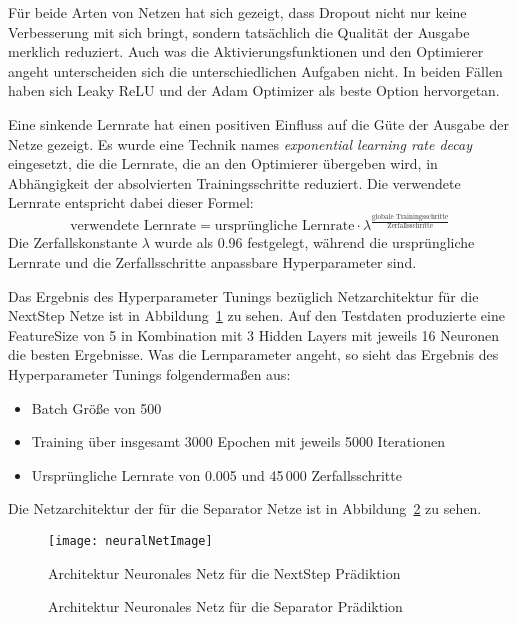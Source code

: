 Für beide Arten von Netzen hat sich gezeigt, dass Dropout nicht nur keine Verbesserung mit sich bringt, sondern tatsächlich die Qualität der Ausgabe merklich reduziert.
Auch was die Aktivierungsfunktionen und den Optimierer angeht unterscheiden sich die unterschiedlichen Aufgaben nicht. 
In beiden Fällen haben sich Leaky ReLU und der Adam Optimizer als beste Option hervorgetan.

Eine sinkende Lernrate hat einen positiven Einfluss auf die Güte der Ausgabe der Netze gezeigt. 
Es wurde eine Technik names \textit{exponential learning rate decay} eingesetzt,
die die Lernrate, die an den Optimierer übergeben wird, in Abhängigkeit der absolvierten Trainingsschritte reduziert.   
Die verwendete Lernrate entspricht dabei dieser Formel:
\begin{equation*}
	\text{verwendete Lernrate} = \text{ursprüngliche Lernrate} \cdot \lambda ^{\frac{\text{globale Trainingsschritte}}{\text{Zerfallsschritte}}}
\end{equation*}
Die Zerfallskonstante \(\lambda\) wurde als 0.96 festgelegt, während die ursprüngliche Lernrate und die Zerfallsschritte anpassbare Hyperparameter sind.


Das Ergebnis des Hyperparameter Tunings bezüglich Netzarchitektur für die NextStep Netze ist in Abbildung~\ref{fig:netArchitectureNextStep} zu sehen.
Auf den Testdaten produzierte eine FeatureSize von 5 in Kombination mit 3 Hidden Layers mit jeweils 16 Neuronen die besten Ergebnisse.
Was die Lernparameter angeht, so sieht das Ergebnis des Hyperparameter Tunings folgendermaßen aus:
\begin{itemize}
    \item Batch Größe von 500
    \item Training über insgesamt 3000 Epochen mit jeweils 5000 Iterationen
    \item Ursprüngliche Lernrate von 0.005 und 45\,000 Zerfallsschritte
\end{itemize}

Die Netzarchitektur der für die Separator Netze ist in Abbildung~\ref{fig:netArchitectureSep} zu sehen.


\begin{figure}[h]
    \centering
	\texttt{[image: neuralNetImage]}
	\caption{Architektur Neuronales Netz für die NextStep Prädiktion}
	\label{fig:netArchitectureNextStep}
\end{figure}

% 

\begin{figure}[h]
    \centering
	\caption{Architektur Neuronales Netz für die Separator Prädiktion}
	\label{fig:netArchitectureSep}
\end{figure}
